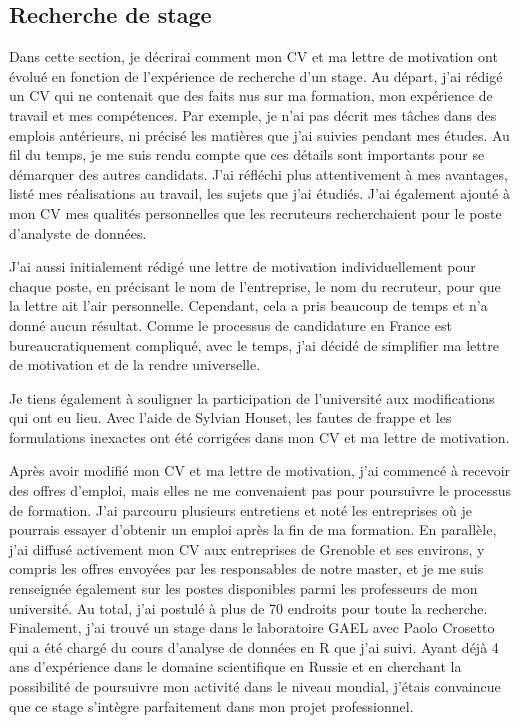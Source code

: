 \documentclass[12pt]{article}
\begin{document}
\subsection{Recherche de stage}

Dans cette section, je décrirai comment mon CV et ma lettre de
motivation ont évolué en fonction de l'expérience de recherche d'un
stage. Au départ, j'ai rédigé un CV qui ne contenait que des faits nus
sur ma formation, mon expérience de travail et mes compétences. Par
exemple, je n'ai pas décrit mes tâches dans des emplois antérieurs, ni
précisé les matières que j'ai suivies pendant mes études. Au fil du
temps, je me suis rendu compte que ces détails sont importants pour se
démarquer des autres candidats. J'ai réfléchi plus attentivement à mes
avantages, listé mes réalisations au travail, les sujets que j'ai
étudiés. J'ai également ajouté à mon CV mes qualités personnelles que
les recruteurs recherchaient pour le poste d'analyste de données.

J'ai aussi initialement rédigé une lettre de motivation individuellement
pour chaque poste, en précisant le nom de l'entreprise, le nom du
recruteur, pour que la lettre ait l'air personnelle. Cependant, cela a
pris beaucoup de temps et n'a donné aucun résultat. Comme le processus
de candidature en France est bureaucratiquement compliqué, avec le
temps, j'ai décidé de simplifier ma lettre de motivation et de la rendre
universelle.

Je tiens également à souligner la participation de l'université aux
modifications qui ont eu lieu. Avec l'aide de Sylvian Houset, les fautes
de frappe et les formulations inexactes ont été corrigées dans mon CV et
ma lettre de motivation.

Après avoir modifié mon CV et ma lettre de motivation, j'ai commencé à
recevoir des offres d'emploi, mais elles ne me convenaient pas pour
poursuivre le processus de formation. J'ai parcouru plusieurs entretiens
et noté les entreprises où je pourrais essayer d'obtenir un emploi après
la fin de ma formation. En parallèle, j'ai diffusé activement mon CV aux
entreprises de Grenoble et ses environs, y compris les offres envoyées
par les responsables de notre master, et je me suis renseignée également
sur les postes disponibles parmi les professeurs de mon université. Au
total, j'ai postulé à plus de 70 endroits pour toute la recherche.
Finalement, j'ai trouvé un stage dans le laboratoire GAEL avec Paolo
Crosetto qui a été chargé du cours d'analyse de données en R que j'ai
suivi. Ayant déjà 4 ans d'expérience dans le domaine scientifique en
Russie et en cherchant la possibilité de poursuivre mon activité dans le
niveau mondial, j'étais convaincue que ce stage s'intègre parfaitement
dans mon projet professionnel.
\end{document}
